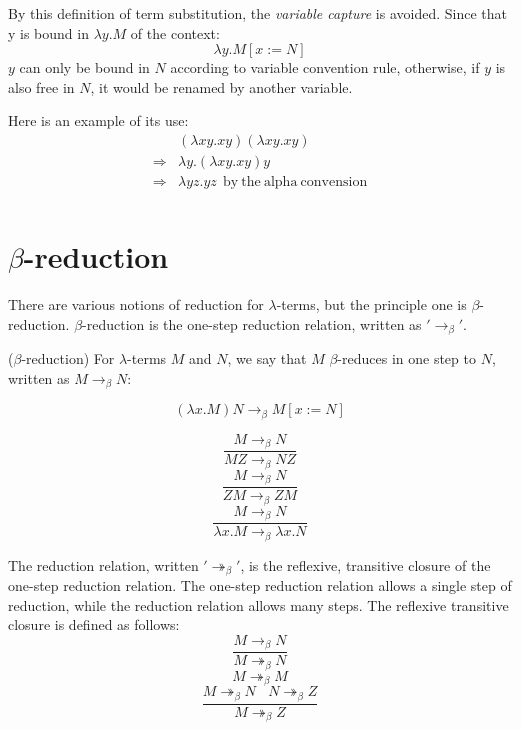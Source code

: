 By this definition of term substitution, the \textit{variable capture} is avoided. Since that y is bound in $\lambda y.M$ of the context:
\begin{equation*}
\lambda y.M[x:=N]
\end{equation*}
$y$ can only be bound in $N$ according to variable convention rule, otherwise, if $y$ is also free in $N$, it would be renamed by another variable. 

Here is an example of its use:
\begin{equation*}
\begin{array}{ll}
&(\lambda xy.xy)(\lambda xy.xy)\\
\Rightarrow& \lambda y.(\lambda xy.xy)y \\
\Rightarrow & \lambda yz.yz\ \ \mathrm{by\ the\ alpha \ convension} \\
\end{array}
\end{equation*}

\section{$\beta$-reduction}

\noindent There are various notions of reduction for $\lambda$-terms, but the principle one is $\beta$-reduction. $\beta$-reduction is the one-step reduction relation, written as $'\rightarrow _\beta'$. 

\begin{def1}
($\beta$-reduction) For $\lambda$-terms $M$ and $N$, we say that $M$ $\beta$-reduces in one step to $N$, written as $M \rightarrow _\beta N$:
\end{def1}
\begin{equation*}
(\lambda x.M)N\rightarrow _\beta M[x:=N]
\end{equation*}

\begin{equation*}
\frac{M\rightarrow _\beta N}{MZ \rightarrow _\beta NZ}
\end{equation*}
\begin{equation*}
\frac{M\rightarrow _\beta N}{ZM \rightarrow _\beta ZM}
\end{equation*}
\begin{equation*}
\frac{M\rightarrow _\beta N}{\lambda x.M \rightarrow _\beta \lambda x.N}
\end{equation*}

\noindent The reduction relation, written $'\twoheadrightarrow _\beta'$, is the reflexive, transitive closure of the one-step reduction relation. The one-step reduction relation allows a single step of reduction, while the reduction relation allows many steps. The reflexive transitive closure is defined as follows:
\begin{equation*}
\frac{M\rightarrow _\beta N}{M \twoheadrightarrow _\beta N}
\end{equation*}
\begin{equation*}
M \twoheadrightarrow _\beta M
\end{equation*}
\begin{equation*}
\frac{M\twoheadrightarrow _\beta N\ \ \ \ N\twoheadrightarrow _\beta Z}{M \twoheadrightarrow _\beta Z}
\end{equation*}

